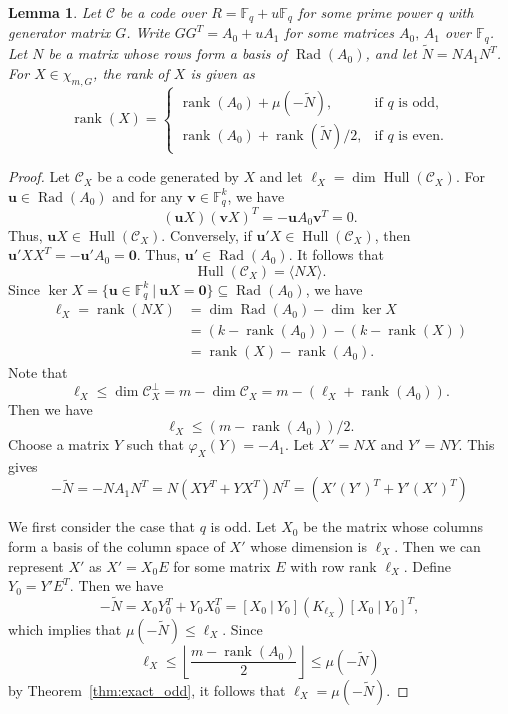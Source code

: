 \documentclass{article}
\newtheorem{lemma}[theorem]{Lemma}
\theoremstyle{definition}
\theoremstyle{remark}
\begin{document}
\begin{lemma}\label{X-rank}
    Let $\mathcal{C}$ be a code over $R=\mathbb{F}_q+u\mathbb{F}_q$ for some prime power $q$ with generator matrix $G$. Write $GG^T=A_0+uA_1$ for some matrices $A_0,\,A_1$ over $\mathbb{F}_q$. Let $N$ be a matrix whose rows form a basis of $\operatorname{Rad}(A_0)$, and let $\tilde{N}=NA_1N^T$. For $X\in \chi_{m, G}$, the rank of $X$ is given as
    \[
    \operatorname{rank}(X)=\begin{cases}
        \operatorname{rank}(A_0)+\mu(-\tilde{N}), & \mbox{if }q\mbox{ is odd},\\
        \operatorname{rank}(A_0)+\operatorname{rank}(\tilde{N})/2, & \mbox{if }q\mbox{ is even}.
    \end{cases}
    \]
\end{lemma}
\begin{proof}
Let $\mathcal{C}_X$ be a code generated by $X$ and let $\ell_X=\dim\operatorname{Hull}(\mathcal{C}_X)$. For $\mathbf{u}\in \operatorname{Rad}(A_0)$ and for any $\mathbf{v}\in \mathbb{F}_q^k$, we have
\[
(\mathbf{u}X)(\mathbf{v}X)^T=-\mathbf{u}A_0\mathbf{v}^T=0.
\]
Thus, $\mathbf{u}X\in \operatorname{Hull}(\mathcal{C}_X)$. Conversely, if $\mathbf{u}'X\in\operatorname{Hull}(\mathcal{C}_X)$, then $\mathbf{u}'XX^T=-\mathbf{u}'A_0=\mathbf{0}$. Thus, $\mathbf{u}'\in \operatorname{Rad}(A_0)$. It follows that
\[
\operatorname{Hull}(\mathcal{C}_X)=\langle NX\rangle.
\]
Since $\ker X=\{\mathbf{u}\in \mathbb{F}_q^k~|~\mathbf{u}X=\mathbf{0}\}\subseteq \operatorname{Rad}(A_0)$, we have
\begin{align*}
\ell_X=\operatorname{rank}(NX)&=\dim \operatorname{Rad}(A_0)-\dim \ker X\\&=(k-\operatorname{rank}(A_0))-(k-\operatorname{rank}(X))\\&=\operatorname{rank}(X)-\operatorname{rank}(A_0).
\end{align*}
Note that
\[
\ell_X\le \dim\mathcal{C}_X^\perp=m-\dim\mathcal{C}_X=m-(\ell_X+\operatorname{rank}(A_0)).
\]
Then we have
\begin{equation}
\ell_X\le (m-\operatorname{rank}(A_0))/2.
\end{equation}
Choose a matrix $Y$ such that $\varphi_X(Y)=-A_1$. Let $X'=NX$ and $Y'=NY$. This gives
\[
-\tilde{N}=-NA_1N^T=N(XY^T+YX^T)N^T=(X'(Y')^T+Y'(X')^T)
\]

We first consider the case that $q$ is odd. Let $X_0$ be the matrix whose columns form a basis of the column space of $X'$ whose dimension is $\ell_X$. Then we can represent $X'$ as $X'=X_0E$ for some matrix  $E$ with row rank $\ell_X$. Define $Y_0=Y'E^T$. Then we have
\[
-\tilde{N}=X_0Y_0^T+Y_0X_0^T=[X_0~|~Y_0](K_{\ell_X})[X_0~|~Y_0]^T,
\]
which implies that $\mu(-\tilde{N})\le \ell_X$. Since
\[
\ell_X\le \left\lfloor\frac{m-\operatorname{rank}(A_0)}{2}\right\rfloor\le \mu(-\tilde{N})
\]
by Theorem~\ref{thm:exact_odd}, it follows that $\ell_X=\mu(-\tilde{N})$.


\end{proof}
\end{document}
